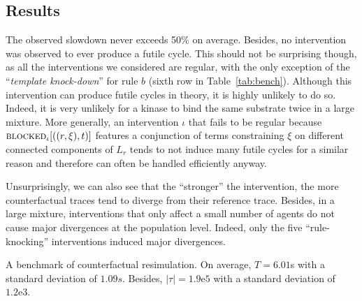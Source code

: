 \subsection{Results}

The observed slowdown never exceeds 50\% on average. Besides, no
intervention was observed to ever produce a futile cycle. This should
not be surprising though, as all the interventions we considered are
regular, with the only exception of the ``\textit{template
  knock-down}'' for rule $b$ (sixth row in
Table~\ref{tab:bench}). Although this intervention can produce futile
cycles in theory, it is highly unlikely to do so.  Indeed, it is very
unlikely for a kinase to bind the same substrate twice in a large
mixture. More generally, an intervention $\iota$ that fails to be
regular because ${\textsc{blocked}}_{\iota}[((r, \xi), t)]$ features a
conjunction of terms constraining $\xi$ on different connected
components of $L_r$ tends to not induce many futile cycles for a
similar reason and therefore can often be handled efficiently anyway.

Unsurprisingly, we can also see that the ``stronger'' the
intervention, the more counterfactual traces tend to diverge from
their reference trace. Besides, in a large mixture, interventions that
only affect a small number of agents do not cause major divergences at
the population level. Indeed, only the five ``rule-knocking''
interventions induced major divergences.





 \begin{table}\footnotesize
  \begin{center}
    
  \end{center}
  \caption{A benchmark of counterfactual resimulation. On average,
    $T = 6.01$s with a standard deviation of $1.09s$. Besides,
    $|\tau| = 1.9\mathrm{e}5$ with a standard deviation of
    $1.2\mathrm{e}3$.}\label{tab:bench}
\end{table}
